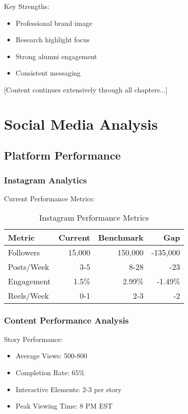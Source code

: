 \documentclass[12pt]{report}
\begin{document}
Key Strengths:
\begin{itemize}
    \item Professional brand image
    \item Research highlight focus
    \item Strong alumni engagement
    \item Consistent messaging
\end{itemize}

[Content continues extensively through all chapters...]

\chapter{Social Media Analysis}

\section{Platform Performance}
\subsection{Instagram Analytics}
Current Performance Metrics:

\begin{table}[H]
\centering
\begin{tabular}{lrrr}
\toprule
\textbf{Metric} & \textbf{Current} & \textbf{Benchmark} & \textbf{Gap} \\
\midrule
Followers & 15,000 & 150,000 & -135,000 \\
Posts/Week & 3-5 & 8-28 & -23 \\
Engagement & 1.5\% & 2.99\% & -1.49\% \\
Reels/Week & 0-1 & 2-3 & -2 \\
\bottomrule
\end{tabular}
\caption{Instagram Performance Metrics}
\label{tab:instagram_metrics}
\end{table}

\subsection{Content Performance Analysis}
Story Performance:
\begin{itemize}
    \item Average Views: 500-800
    \item Completion Rate: 65\%
    \item Interactive Elements: 2-3 per story
    \item Peak Viewing Time: 8 PM EST
\end{itemize}
\end{document}
